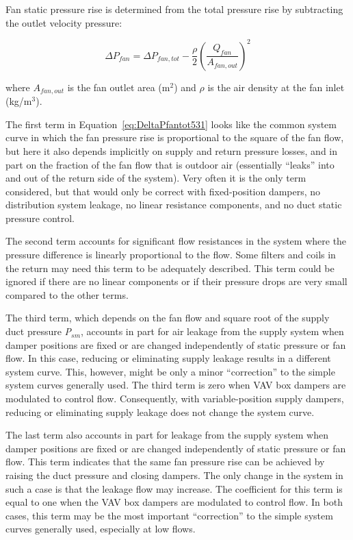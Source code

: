 Fan static pressure rise is determined from the total pressure rise by subtracting the outlet velocity pressure:

\begin{equation}
\Delta {P_{fan}} = \Delta {P_{fan,tot}} - \frac{\rho }{2}{\left( {\frac{{{Q_{fan}}}}{{{A_{fan,out}}}}} \right)^2}
\end{equation}

where \(A_{fan,out}\) is the fan outlet area (m\(^{2}\)) and \(\rho\) is the air density at the fan inlet (kg/m\(^{3}\)).

The first term in Equation~\ref{eq:DeltaPfantot531} looks like the common system curve in which the fan pressure rise is proportional to the square of the fan flow, but here it also depends implicitly on supply and return pressure losses, and in part on the fraction of the fan flow that is outdoor air (essentially ``leaks'' into and out of the return side of the system). Very often it is the only term considered, but that would only be correct with fixed-position dampers, no distribution system leakage, no linear resistance components, and no duct static pressure control.

The second term accounts for significant flow resistances in the system where the pressure difference is linearly proportional to the flow. Some filters and coils in the return may need this term to be adequately described. This term could be ignored if there are no linear components or if their pressure drops are very small compared to the other terms.

The third term, which depends on the fan flow and square root of the supply duct pressure \emph{P\(_{sm}\)}, accounts in part for air leakage from the supply system when damper positions are fixed or are changed independently of static pressure or fan flow. In this case, reducing or eliminating supply leakage results in a different system curve. This, however, might be only a minor ``correction'' to the simple system curves generally used. The third term is zero when VAV box dampers are modulated to control flow. Consequently, with variable-position supply dampers, reducing or eliminating supply leakage does not change the system curve.

The last term also accounts in part for leakage from the supply system when damper positions are fixed or are changed independently of static pressure or fan flow. This term indicates that the same fan pressure rise can be achieved by raising the duct pressure and closing dampers. The only change in the system in such a case is that the leakage flow may increase. The coefficient for this term is equal to one when the VAV box dampers are modulated to control flow. In both cases, this term may be the most important ``correction'' to the simple system curves generally used, especially at low flows.

